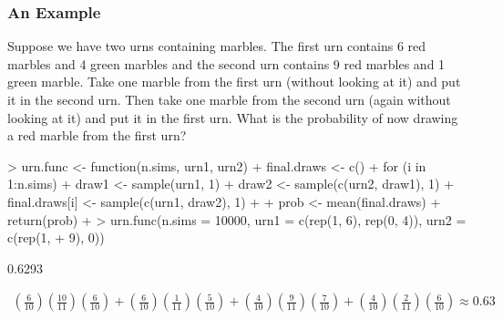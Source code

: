 \documentclass[handout]{beamer}
\begin{document}
\begin{frame}[fragile]
\frametitle{An Example}
\pause
\small
Suppose we have two urns containing marbles.  The first urn contains 6
red marbles and 4 green marbles and the second urn contains 9 red
marbles and 1 green marble.  Take one marble from the first urn
(without looking at it) and put it in the second urn.  Then take one
marble from the second urn (again without looking at it) and put it in
the first urn.  What is the probability of now drawing a red marble
from the first urn?
\pause
\medskip
\tiny
\begin{Schunk}
\begin{Sinput}
> urn.func <- function(n.sims, urn1, urn2) {
+     final.draws <- c()
+     for (i in 1:n.sims) {
+         draw1 <- sample(urn1, 1)
+         draw2 <- sample(c(urn2, draw1), 1)
+         final.draws[i] <- sample(c(urn1, draw2), 1)
+     }
+     prob <- mean(final.draws)
+     return(prob)
+ }
> urn.func(n.sims = 10000, urn1 = c(rep(1, 6), rep(0, 4)), urn2 = c(rep(1, 
+     9), 0))
\end{Sinput}
\begin{Soutput}
[1] 0.6293
\end{Soutput}
\end{Schunk}
\pause
\color{red}
\begin{eqnarray*}
\left(\frac{6}{10} \right)\left(\frac{10}{11} \right)
\left(\frac{6}{10} \right) + \left(\frac{6}{10} \right)
\left(\frac{1}{11} \right) \left(\frac{5}{10} \right) +
\left(\frac{4}{10} \right) \left(\frac{9}{11} \right)
\left(\frac{7}{10} \right) + \left(\frac{4}{10} \right)
\left(\frac{2}{11} \right) \left(\frac{6}{10} \right) \approx 0.63
\end{eqnarray*}
\color{black}
\normalsize
\end{frame}
\end{document}
